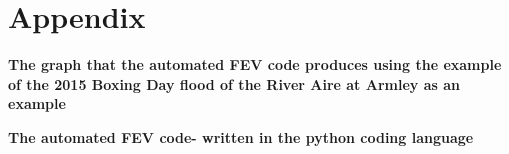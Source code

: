 \documentclass[11pt,a4paper]{article}
\begin{document}
\section{Appendix}
{\bf The graph that the automated FEV code produces using the example of the 2015 Boxing Day flood of the River Aire at Armley as an example}\\
\begin{figure}[H]
\begin{center}
\end{center}
\end{figure}
{\bf The automated FEV code- written in the python coding language}\\
\begin{spacing}{1}\footnotesize{}
\end{spacing}
\end{document}
